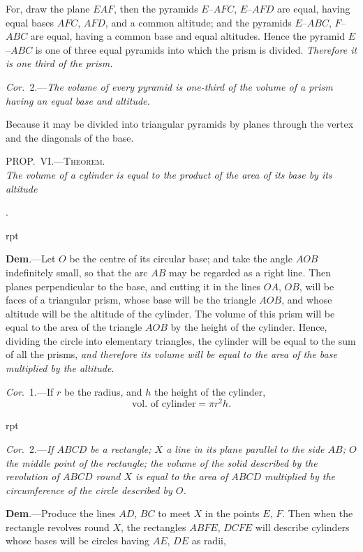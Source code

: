 \documentclass[oneside]{book}
\newcounter{wrapwidth}
\newcommand\myprop[2]{
\bigskip\Needspace*{4\baselineskip}\begin{center}\textsc{#1}\\\medskip\emph{#2}\par\end{center}
}
\newcommand\imgflow[3]{
\setcounter{wrapwidth}{#1}

\begin{wrapfigure}[#2]{r}{\value{wrapwidth}pt}
\begin{center}
\vspace{-0.3in}

\end{center}
\end{wrapfigure}
}
\begin{document}
For, draw the plane $EAF$, then
the pyramids $E$--$AFC$, $E$--$AFD$
are equal, having equal bases $AFC$,
$AFD$, and a common altitude; and
the pyramids $E$--$ABC$, $F$--$ABC$ are
equal, having a common base and
equal altitudes. Hence the pyramid
$E$--$ABC$ is one of three
equal pyramids into which the
prism is divided. \emph{Therefore it is
one third of the prism.}

\emph{Cor.}~2.---\textit{The volume of every pyramid is one-third of
the volume of a prism having an equal base and altitude.}

Because it may be divided into triangular pyramids
by planes through the vertex and the diagonals of the
base.



\myprop{PROP\@.~VI\@.---Theorem.}{The volume of a cylinder\index{Cylinder} is equal to the product of the
area of its base by its altitude}.


\imgflow{138}{11}{f244}

\textbf{Dem}.---Let $O$ be the centre of its circular base; and
take the angle $AOB$ indefinitely
small, so that the arc
$AB$ may be regarded as a
right line. Then planes perpendicular
to the base, and
cutting it in the lines $OA$,
$OB$, will be faces of a triangular
prism, whose base
will be the triangle $AOB$,
and whose altitude will be
the altitude of the cylinder.
The volume of this prism will be equal to the area of
the triangle $AOB$ by the height of the cylinder. Hence,
dividing the circle into elementary triangles, the cylinder
will be equal to the sum of all the prisms, \textit{and
therefore its volume will be equal to the area of the base
multiplied by the altitude}.

\textit{Cor}.~1.---If $r$ be the radius, and $h$ the height of the
cylinder,
\[
\text{vol.\ of cylinder} = \pi r^2 h.
\]


\imgflow{135}{8}{f245}

\textit{Cor}.~2.---\textit{If $ABCD$ be a rectangle; $X$ a line in its plane
parallel to the side $AB$; $O$ the
middle point of the rectangle;
the volume of the solid described
by the revolution of
$ABCD$ round $X$ is equal to
the area of $ABCD$ multiplied
by the circumference of the
circle described by $O$.}

\textbf{Dem}.---Produce the lines $AD$, $BC$ to meet $X$ in the
points $E$, $F$. Then when the rectangle revolves round
$X$, the rectangles $ABFE$, $DCFE$ will describe cylinders
whose bases will be circles having $AE$, $DE$ as radii,
\end{document}

